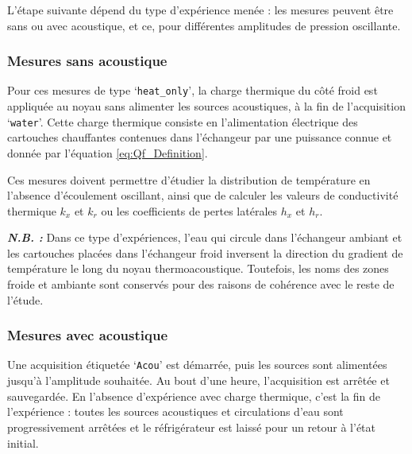 L'étape suivante dépend du type d'expérience menée : les mesures peuvent être sans ou avec acoustique, et ce, pour  différentes amplitudes de pression oscillante. %

\subsubsection{Mesures sans acoustique}\label{chap:MesureSansAcou}
Pour ces mesures de type `\texttt{heat\_{}only}', la charge thermique du côté froid est appliquée au noyau sans alimenter les sources acoustiques, à la fin de l'acquisition `\texttt{water}'. Cette charge thermique consiste en l'alimentation électrique des cartouches chauffantes contenues dans l'échangeur par une puissance connue et donnée par l'équation \ref{eq:Qf_Definition}.\smallskip

Ces mesures doivent permettre d'étudier la distribution de température en l'absence d'écoulement oscillant, ainsi que de calculer les valeurs de conductivité thermique $k_x$ et $k_r$ ou les coefficients de pertes latérales $h_x$ et $h_r$.\medskip

\textbf{\textit{N.B. :}} Dans ce type d'expériences, l'eau qui circule dans l'échangeur ambiant et les cartouches placées dans l'échangeur froid inversent la direction du gradient de température le long du noyau thermoacoustique. Toutefois, les noms des zones \og froide \fg{} et \og ambiante \fg{} sont conservés pour des raisons de cohérence avec le reste de l'étude.

\subsubsection{Mesures avec acoustique}\label{chap:MesureAvecAcou} 
Une acquisition étiquetée `\texttt{Acou}' est démarrée, puis les sources sont alimentées jusqu'à l'amplitude souhaitée. Au bout d'une heure, l'acquisition est arrêtée et sauvegardée. En l'absence d'expérience avec charge thermique, c'est la fin de l'expérience : toutes les sources acoustiques et circulations d'eau sont progressivement arrêtées et le réfrigérateur est laissé pour un retour à l'état initial.\smallskip

